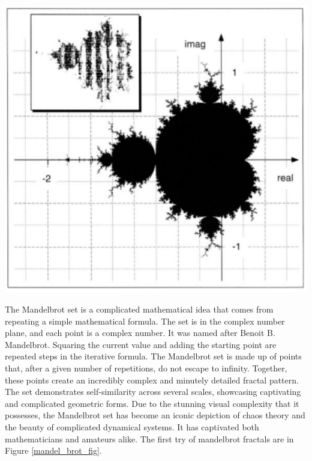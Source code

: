 \documentclass{article}
\begin{document}
\begin{minipage}{0.45\textwidth}
    \centering
    \includegraphics[width=1\textwidth]{Figures/mandelbrot.png}
    \label{mandel_brot_fig}
\end{minipage}%
\hfill
\begin{minipage}{0.45\textwidth}
    The Mandelbrot set is a complicated mathematical idea that comes from repeating a simple mathematical formula. The set is in the complex number plane, and each point is a complex number. It was named after Benoit B. Mandelbrot. Squaring the current value and adding the starting point are repeated steps in the iterative formula. The Mandelbrot set is made up of points that, after a given number of repetitions, do not escape to infinity. Together, these points create an incredibly complex and minutely detailed fractal pattern. The set demonstrates self-similarity across several scales, showcasing captivating and complicated geometric forms. Due to the stunning visual complexity that it possesses, the Mandelbrot set has become an iconic depiction of chaos theory and the beauty of complicated dynamical systems. It has captivated both mathematicians and amateurs alike\cite{devaney_chaos_1989}. The first try of mandelbrot fractals are  in Figure \ref{mandel_brot_fig}.
\end{minipage}
\end{document}
